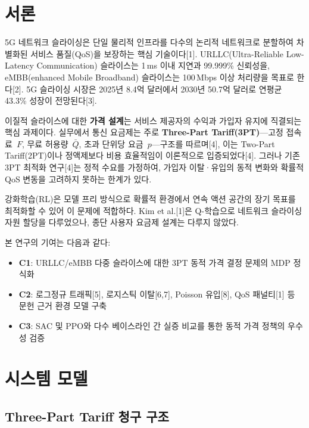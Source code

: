 \documentclass[10pt, twocolumn]{article}
\begin{document}
\section{서론}

5G 네트워크 슬라이싱은 단일 물리적 인프라를 다수의 논리적 네트워크로 분할하여 차별화된 서비스 품질(QoS)을 보장하는 핵심 기술이다[1].
URLLC(Ultra-Reliable Low-Latency Communication) 슬라이스는 1\,ms 이내 지연과 99.999\% 신뢰성을, eMBB(enhanced Mobile Broadband) 슬라이스는 100\,Mbps 이상 처리량을 목표로 한다[2].
5G 슬라이싱 시장은 2025년 8.4억 달러에서 2030년 50.7억 달러로 연평균 43.3\% 성장이 전망된다[3].

이질적 슬라이스에 대한 \textbf{가격 설계}는 서비스 제공자의 수익과 가입자 유지에 직결되는 핵심 과제이다.
실무에서 통신 요금제는 주로 \textbf{Three-Part Tariff(3PT)}---고정 접속료~$F$, 무료 허용량~$\bar{Q}$, 초과 단위당 요금~$p$---구조를 따르며[4], 이는 Two-Part Tariff(2PT)이나 정액제보다 비용 효율적임이 이론적으로 입증되었다[4].
그러나 기존 3PT 최적화 연구[4]는 정적 수요를 가정하여, 가입자 이탈·유입의 동적 변화와 확률적 QoS 변동을 고려하지 못하는 한계가 있다.

강화학습(RL)은 모델 프리 방식으로 확률적 환경에서 연속 액션 공간의 장기 목표를 최적화할 수 있어 이 문제에 적합하다.
Kim et al.[1]은 Q-학습으로 네트워크 슬라이싱 자원 할당을 다루었으나, 종단 사용자 요금제 설계는 다루지 않았다.

본 연구의 기여는 다음과 같다:
\begin{itemize}
  \item \textbf{C1}: URLLC/eMBB 다중 슬라이스에 대한 3PT 동적 가격 결정 문제의 MDP 정식화
  \item \textbf{C2}: 로그정규 트래픽[5], 로지스틱 이탈[6,7], Poisson 유입[8], QoS 패널티[1] 등 문헌 근거 환경 모델 구축
  \item \textbf{C3}: SAC 및 PPO와 다수 베이스라인 간 실증 비교를 통한 동적 가격 정책의 우수성 검증
\end{itemize}

\section{시스템 모델}

\subsection{Three-Part Tariff 청구 구조}
\end{document}
